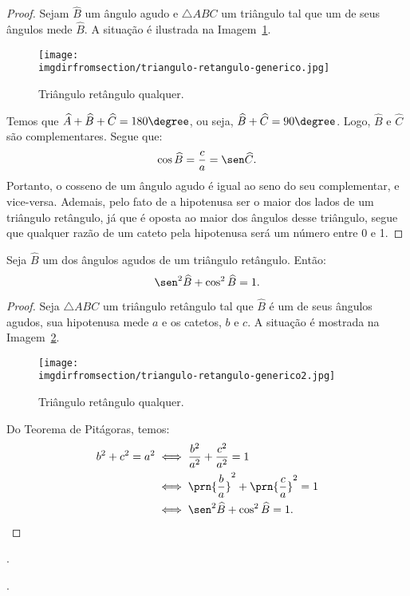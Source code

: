 \begin{proof}
	Sejam $\widehat B$ um ângulo agudo e $\triangle ABC$ um triângulo tal que um de seus ângulos mede $\widehat B$.
	A situação é ilustrada na Imagem~\ref{img:triangulo-retangulo-generico}.
	\begin{figure}[H]
		\centering
		\texttt{[image: \\imgdirfromsection/triangulo-retangulo-generico.jpg]}
		\caption{Triângulo retângulo qualquer.}
		\label{img:triangulo-retangulo-generico}
	\end{figure}
	Temos que $\widehat A + \widehat B  + \widehat C = 180\degree$, ou seja, $\widehat B  + \widehat C = 90\degree$.
	Logo, $\widehat B$ e $\widehat C$ são complementares. Segue que:
	$$\cos \widehat B = \frac c a = \sen \widehat C.$$ Portanto, o cosseno de um ângulo agudo é igual ao seno do seu complementar,
	e vice-versa. Ademais, pelo fato de a hipotenusa ser o maior dos lados de um triângulo retângulo, já que é oposta ao 
	maior dos ângulos desse triângulo, segue que qualquer razão de um cateto pela hipotenusa será um número entre 0 e 1.
\end{proof}

\begin{proposition}
Seja $\widehat B$ um dos ângulos agudos de um triângulo retângulo. Então:
$$\sen^2 \widehat B + \cos^2 \widehat B = 1.$$
\end{proposition}

\begin{proof}
	Seja $\triangle ABC$ um triângulo retângulo tal que $\widehat B$ é um de seus ângulos agudos, sua hipotenusa mede $a$ e os catetos, $b$ e $c$. A situação é mostrada na Imagem~\ref{img:prova-relacao-fundamental-trigonometria}.
	\begin{figure}[H]
		\centering
		\texttt{[image: \\imgdirfromsection/triangulo-retangulo-generico2.jpg]}
		\caption{Triângulo retângulo qualquer.}
		\label{img:prova-relacao-fundamental-trigonometria}
	\end{figure}
	Do Teorema de Pitágoras, temos:
	\begin{align*}
		b^2 + c^2 = a^2 &\iff \frac{b^2}{a^2} + \frac{c^2}{a^2} = 1 \\ &\iff \prn{\frac b a}^2 + \prn{\frac c a}^2 = 1 \\ 
		&\iff \sen^2 \widehat B  +  \cos^2 \widehat B= 1.
	\end{align*}
\end{proof}

\begin{onlineact}
	.
\end{onlineact}

\begin{onlineact}
	.
\end{onlineact}